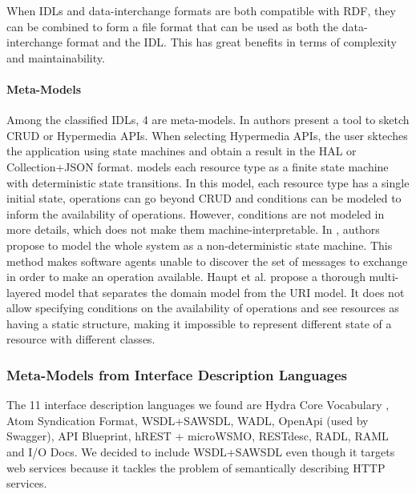 When IDLs and data-interchange formats are both compatible with RDF, they can be combined to form a file format that can be used as both the data-interchange format and the IDL. This has great benefits in terms of complexity and maintainability.

\paragraph{Meta-Models}

Among the classified IDLs, 4 are meta-models. In \cite{Rapido} authors present a tool to sketch CRUD or Hypermedia APIs. When selecting Hypermedia APIs, the user skteches the application using state machines and obtain a result in the HAL or Collection+JSON format. \cite{Schreier:2011:MRA:1967428.1967434} models each resource type as a finite state machine with deterministic state transitions. In this model, each resource type has a single initial state, operations can go beyond CRUD and conditions can be modeled to inform the availability of operations. However, conditions are not modeled in more details, which does not make them machine-interpretable. In \cite{10.1007/978-3-642-22233-7_24}, authors propose to model the whole system as a non-deterministic state machine. This method makes software agents unable to discover the set of messages to exchange in order to make an operation available. Haupt et al. \cite{10.1109/ICWS.2014.30} propose a thorough multi-layered model that separates the domain model from the URI model. It does not allow specifying conditions on the availability of operations and see resources as having a static structure, making it impossible to represent different state of a resource with different classes. 

\subsubsection{Meta-Models from Interface Description Languages}

The 11 interface description languages we found are Hydra Core Vocabulary \cite{Lanthaler:2013:CGW:2487788.2487799}, Atom Syndication Format\cite{AtomSF}, WSDL+SAWSDL, WADL, OpenApi (used by Swagger), API Blueprint, hREST + microWSMO, RESTdesc, RADL, RAML and I/O Docs. We decided to include WSDL+SAWSDL even though it targets web services \cite{john2012framework} because it tackles the problem of semantically describing HTTP services.

